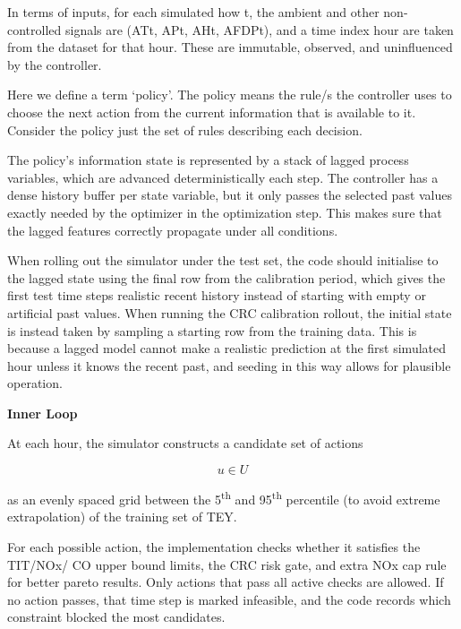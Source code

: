 \documentclass[11pt]{article}
\begin{document}
In terms of inputs, for each simulated how t, the ambient and other
non-controlled signals are (ATt\hspace{0pt}, APt\hspace{0pt},
AHt\hspace{0pt}, AFDPt\hspace{0pt}), and a time index hour are taken
from the dataset for that hour. These are immutable, observed, and
uninfluenced by the controller.

Here we define a term `policy'. The policy means the rule/s the
controller uses to choose the next action from the current information
that is available to it. Consider the policy just the set of rules
describing each decision.

The policy's information state is represented by a stack of lagged
process variables, which are advanced deterministically each step. The
controller has a dense history buffer per state variable, but it only
passes the selected past values exactly needed by the optimizer in the
optimization step. This makes sure that the lagged features correctly
propagate under all conditions.

When rolling out the simulator under the test set, the code should
initialise to the lagged state using the final row from the calibration
period, which gives the first test time steps realistic recent history
instead of starting with empty or artificial past values. When running
the CRC calibration rollout, the initial state is instead taken by
sampling a starting row from the training data. This is because a lagged
model cannot make a realistic prediction at the first simulated hour
unless it knows the recent past, and seeding in this way allows for
plausible operation.

\textbf{Inner Loop}

At each hour, the simulator constructs a candidate set of actions

\[u\mathbf{\in}U\]

as an evenly spaced grid between the 5\textsuperscript{th} and
95\textsuperscript{th} percentile (to avoid extreme extrapolation) of
the training set of TEY.

For each possible action, the implementation checks whether it satisfies
the TIT/NOx/ CO upper bound limits, the CRC risk gate, and extra NOx cap
rule for better pareto results. Only actions that pass all active checks
are allowed. If no action passes, that time step is marked infeasible,
and the code records which constraint blocked the most candidates.
\end{document}

